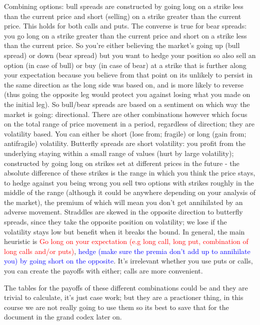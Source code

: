 \documentclass[9pt]{extarticle}
\begin{document}
Combining options: bull spreads are constructed by going long on a strike 
less than the current price and short (selling) on a strike greater than the 
current price. This holds for both calls and puts. The converse is true for 
bear spreads: you go long on a strike greater than the current price and 
short on a strike less than the current price. So you're either 
believing the market's going up (bull spread) or down (bear spread)
but you want to hedge your position so also sell an option (in case 
of bull) or buy (in case of bear) at a strike that is further 
along your expectation because you believe from that point on its unlikely
to persist in the same direction as the long side was based on, and is more likely 
to reverse (thus going the opposite leg would protect you against losing what 
you made on the initial leg). So bull/bear spreads are based on a 
sentiment on which way the market is going: directional. There are other 
combinations however which focus on the total range of price movement in a period, regardless 
of direction; they are volatility based. You can either be short (lose from; fragile) or 
long (gain from; antifragile) volatility. Butterfly spreads are short volatility: 
you profit from the underlying staying within a small range of values (hurt by large volatility); 
constructed by going long on strikes set at different prices in the future - the absolute 
difference of these strikes is the range in which you think the price stays, to hedge against you 
being wrong you sell two options with strikes roughly in the middle of the range (although it could 
be anywhere depending on your analysis of the market), the premium of which will mean you don't get annihilated 
by an adverse movement. Straddles are skewed in the opposite direction to butterfly spreads, since they take 
the opposite position on volatility; we lose if the volatility stays low but benefit when it breaks the bound. In general, the main heuristic is \textcolor{red}{Go long on your 
expectation (e.g long call, long put, combination of long calls and/or puts)}, \textcolor{blue}{hedge (make sure the premia don't add up to annihilate you) 
by going short on the opposite}. It's irrelevant whether you use puts or calls, you can 
create the payoffs with either; calls are more convenient.

The tables for the payoffs of these different combinations could be  and they are trivial to 
calculate, it's just case work; but they are 
a practioner thing, in this course we are not really going to use them so its best to 
save that for the document in the grand codex later on.
\end{document}
